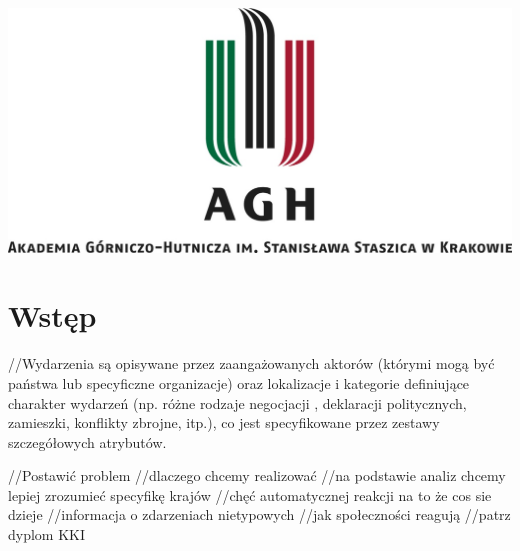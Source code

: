 \documentclass[11pt]{report}
\begin{document}
    \begin{titlepage}
        \centering
        \includegraphics[width=1 \textwidth]{fig/AGH.jpg}
        \vspace{0.03\textheight}
        \bigskip
        \vspace{0.2\textheight}
        \par

        \vspace{0.1\textheight}
    \end{titlepage}

    \tableofcontents


    \chapter{Wstęp}
    //Wydarzenia są opisywane przez zaangażowanych aktorów (którymi mogą być państwa lub specyficzne organizacje) oraz lokalizacje i kategorie definiujące charakter wydarzeń (np. różne rodzaje negocjacji , deklaracji politycznych, zamieszki, konflikty zbrojne, itp.), co jest specyfikowane przez zestawy szczegółowych atrybutów.

    //Postawić problem
    //dlaczego chcemy realizować
    //na podstawie analiz chcemy lepiej zrozumieć specyfikę krajów
    //chęć automatycznej reakcji na to że cos sie dzieje
    //informacja o zdarzeniach nietypowych
    //jak społeczności reagują
    //patrz dyplom KKI
\end{document}

